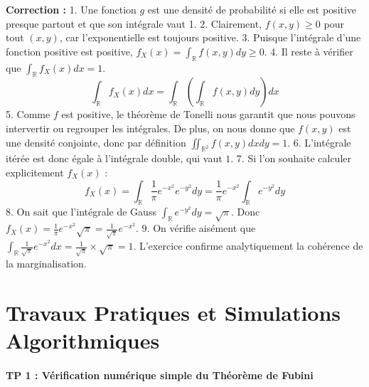 \documentclass[11pt,a4paper]{article}
\begin{document}
\textbf{Correction :}
1. Une fonction $g$ est une densité de probabilité si elle est positive presque partout et que son intégrale vaut 1.
2. Clairement, $f(x, y) \ge 0$ pour tout $(x,y)$, car l'exponentielle est toujours positive.
3. Puisque l'intégrale d'une fonction positive est positive, $f_X(x) = \int_\mathbb{R} f(x, y) dy \ge 0$.
4. Il reste \`a vérifier que $\int_\mathbb{R} f_X(x) dx = 1$.
   $$ \int_{\mathbb{R}} f_X(x) dx = \int_{\mathbb{R}} \left( \int_{\mathbb{R}} f(x, y) dy \right) dx $$
5. Comme $f$ est positive, le théorème de Tonelli nous garantit que nous pouvons intervertir ou regrouper les intégrales. De plus, on nous donne que $f(x,y)$ est une densité conjointe, donc par définition $\iint_{\mathbb{R}^2} f(x,y) dx dy = 1$.
6. L'intégrale itérée est donc égale \`a l'intégrale double, qui vaut $1$.
7. Si l'on souhaite calculer explicitement $f_X(x)$ :
   $$ f_X(x) = \int_{\mathbb{R}} \frac{1}{\pi} e^{-x^2} e^{-y^2} dy = \frac{1}{\pi} e^{-x^2} \int_{\mathbb{R}} e^{-y^2} dy $$
8. On sait que l'intégrale de Gauss $\int_\mathbb{R} e^{-y^2} dy = \sqrt{\pi}$.
   Donc $f_X(x) = \frac{1}{\pi} e^{-x^2} \sqrt{\pi} = \frac{1}{\sqrt{\pi}} e^{-x^2}$.
9. On vérifie aisément que $\int_\mathbb{R} \frac{1}{\sqrt{\pi}} e^{-x^2} dx = \frac{1}{\sqrt{\pi}} \times \sqrt{\pi} = 1$. L'exercice confirme analytiquement la cohérence de la marginalisation.




\newpage
\part{Travaux Pratiques et Simulations Algorithmiques}
\subsection*{TP 1 : Vérification numérique simple du Théorème de Fubini}
\end{document}
